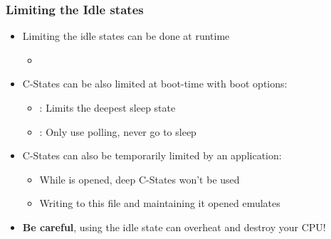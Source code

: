 \begin{frame}
        \frametitle{Limiting the Idle states}
        \begin{itemize}
                \item Limiting the idle states can be done at runtime
                        \begin{itemize}
                                \item {}
                        \end{itemize}
                \item C-States can be also limited at boot-time with boot options:
                        \begin{itemize}
                                \item {}: Limits the deepest sleep state
                                \item {}: Only use polling, never go to sleep
                        \end{itemize}
                \item C-States can also be temporarily limited by an application:
                        \begin{itemize}
                                \item While  is opened, deep C-States won't be used
                                \item Writing  to this file and maintaining it opened emulates 
                        \end{itemize}
                \item \textbf{Be careful}, using the  idle state can overheat and destroy your CPU!
        \end{itemize}
\end{frame}


